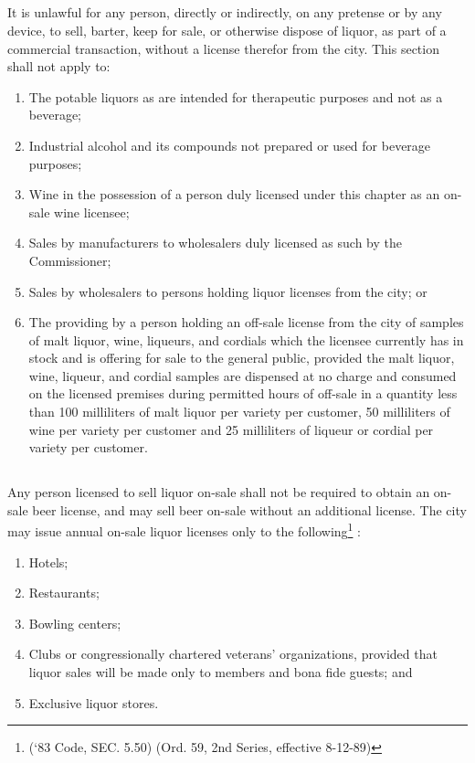 \subsection{}
It is unlawful for any person, directly or indirectly, on any pretense or by any device, to sell, barter, keep for sale, or otherwise dispose of liquor, as part of a commercial transaction, without a license therefor from the city. This section shall not apply to:
\begin{enumerate}[{\indent}1)]
    \item The potable liquors as are intended for therapeutic purposes and not as a beverage; 
    \item Industrial alcohol and its compounds not prepared or used for beverage purposes; 
    \item Wine in the possession of a person duly licensed under this chapter as an on-sale wine licensee;
    \item Sales by manufacturers to wholesalers duly licensed as such by the Commissioner; 
    \item Sales by wholesalers to persons holding liquor licenses from the city; or 
    \item The providing by a person holding an off-sale license from the city of samples of malt liquor, wine, liqueurs, and cordials which the licensee currently has in stock and is offering for sale to the general public, provided the malt liquor, wine, liqueur, and cordial samples are dispensed at no charge and consumed on the licensed premises during permitted hours of off-sale in a quantity less than 100 milliliters of malt liquor per variety per customer, 50 milliliters of wine per variety per customer and 25 milliliters of liqueur or cordial per variety per customer.
\end{enumerate}
\subsection{}
Any person licensed to sell liquor on-sale shall not be required to obtain an on-sale beer license, and may sell beer on-sale without an additional license.  The city may issue annual on-sale liquor licenses only to the following\footnote{(‘83 Code, SEC. 5.50) (Ord. 59, 2nd Series, effective 8-12-89)}
:
\begin{enumerate}[{\indent}1)]
    \item Hotels; 
    \item Restaurants; 
    \item Bowling centers; 
    \item Clubs or congressionally chartered veterans’ organizations, provided that liquor sales will be made only to members and bona fide guests; and 
    \item Exclusive liquor stores.
\end{enumerate}


